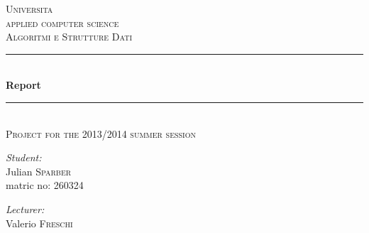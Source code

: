 \documentclass[11pt, a4paper, titlepage, block]{article}
\begin{document}
\begin{titlepage}

\newcommand{\HRule}{\rule{\linewidth}{0.5mm}} %

\center %
 

\textsc{\LARGE Universita}\\[1.5cm] %
\textsc{\Large applied computer science}\\[0.5cm] %
\textsc{\large Algoritmi e Strutture Dati}\\[0.5cm] %



\HRule \\[0.4cm]
{ \huge \bfseries Report}\\[0.2cm] %
\HRule \\[0.4cm]
\textsc{\large Project for the 2013/2014 summer session}
\\[0.5cm]

\begin{minipage}{\textwidth}
\begin{flushleft}
\emph{Student:}\\
Julian \textsc{Sparber}\\ %
matric no: 260324
\end{flushleft}
\end{minipage}

\begin{minipage}{\textwidth}
\begin{flushright}
\emph{Lecturer:} \\
Valerio \textsc{Freschi} %
\end{flushright}
\end{minipage}\\[11cm]


\end{titlepage}
\end{document}
